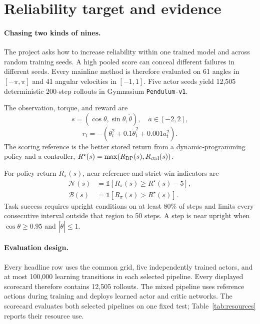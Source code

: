 \section{Reliability target and evidence}

\paragraph{Chasing two kinds of nines.}
The project asks how to increase reliability within one trained model and across random training seeds. A high pooled score can conceal different failures in different seeds. Every mainline method is therefore evaluated on 61 angles in $[-\pi,\pi]$ and 41 angular velocities in $[-1,1]$. Five actor seeds yield 12,505 deterministic 200-step rollouts in Gymnasium \texttt{Pendulum-v1}.

The observation, torque, and reward are
\[
s=(\cos\theta,\sin\theta,\dot\theta),\quad a\in[-2,2],
\]
\[
r_t=-(\theta_t^2+0.1\dot\theta_t^2+0.001a_t^2).
\]
The scoring reference is the better stored return from a dynamic-programming policy and a controller,
$R^\star(s)=\max(R_{\rm DP}(s),R_{\rm ctrl}(s))$.

For policy return $R_\pi(s)$, near-reference and strict-win indicators are
\[
\begin{aligned}
\mathcal N(s)&=\mathbb 1[R_\pi(s)\ge R^\star(s)-5],\\
\mathcal B(s)&=\mathbb 1[R_\pi(s)>R^\star(s)].
\end{aligned}
\]
Task success requires upright conditions on at least 80\% of steps and limits every consecutive interval outside that region to 50 steps. A step is near upright when $\cos\theta\ge0.95$ and $|\dot\theta|\le1$.

\paragraph{Evaluation design.}
Every headline row uses the common grid, five independently trained actors, and at most 100,000 learning transitions in each selected pipeline. Every displayed scorecard therefore contains 12,505 rollouts. The mixed pipeline uses reference actions during training and deploys learned actor and critic networks. The scorecard evaluates both selected pipelines on one fixed test; Table~\ref{tab:resources} reports their resource use.

